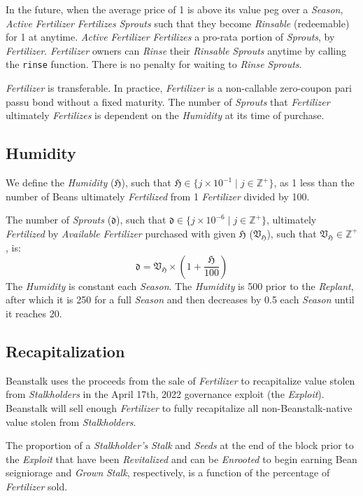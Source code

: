 \documentclass[tikz]{article}
\newcommand{\code}[1]{\texttt{#1}}
\newcommand{\term}[1]{\textsl{#1}}
\newcommand{\Bean}{} %
\begin{document}
In the future, when the average price of \Bean1 is above its value peg over a \term{Season}, \term{Active} \term{Fertilizer} \term{Fertilizes} \term{Sprouts} such that they become \term{Rinsable} (redeemable) for \Bean1 at anytime. \term{Active} \term{Fertilizer} \term{Fertilizes} a pro-rata portion of \term{Sprouts}, by \term{Fertilizer}. \term{Fertilizer} owners can \term{Rinse} their \term{Rinsable} \term{Sprouts} anytime by calling the \code{rinse} function. There is no penalty for waiting to \term{Rinse} \term{Sprouts}.

\term{Fertilizer} is transferable. In practice, \term{Fertilizer} is a non-callable zero-coupon pari passu bond without a fixed maturity. The number of \term{Sprouts} that \term{Fertilizer} ultimately \term{Fertilizes} is dependent on the \term{Humidity} at its time of purchase.

\subsection{Humidity}
We define the \term{Humidity} ($\mathfrak{H}$), such that $\mathfrak{H} \in \{j \times 10^{-1} \mid j \in \mathbb{Z}^{+} \}$, as 1 less than the number of Beans ultimately \term{Fertilized} from 1 \term{Fertilizer} divided by 100. 

The number of \term{Sprouts} ($\mathfrak{d}$), such that $\mathfrak{d} \in \{j \times 10^{-6} \mid j \in \mathbb{Z}^{+} \}$, ultimately \term{Fertilized} by \term{Available} \term{Fertilizer} purchased with given $\mathfrak{H}$ ($\mathfrak{V}_\mathfrak{H}$), such that $\mathfrak{V}_\mathfrak{H} \in \mathbb{Z}^{+}$, is:
$$\mathfrak{d} = \mathfrak{V}_\mathfrak{H} \times \left(1 + \frac{\mathfrak{H}}{100}\right)$$
The \term{Humidity} is constant each \term{Season}. The \term{Humidity} is 500 prior to the \term{Replant}, after which it is 250 for a full \term{Season} and then decreases by 0.5 each \term{Season} until it reaches 20.

\subsection{Recapitalization}
Beanstalk uses the proceeds from the sale of \term{Fertilizer} to recapitalize value stolen from \term{Stalkholders} in the April 17th, 2022 governance exploit (the \term{Exploit}). Beanstalk will sell enough \term{Fertilizer} to fully recapitalize all non-Beanstalk-native value stolen from \term{Stalkholders}. 

The proportion of a \term{Stalkholder's} \term{Stalk} and \term{Seeds} at the end of the block prior to the \term{Exploit} that have been \term{Revitalized} and can be \term{Enrooted} to begin earning Bean seigniorage and \term{Grown} \term{Stalk}, respectively, is a function of the percentage of \term{Fertilizer} sold.
\end{document}
